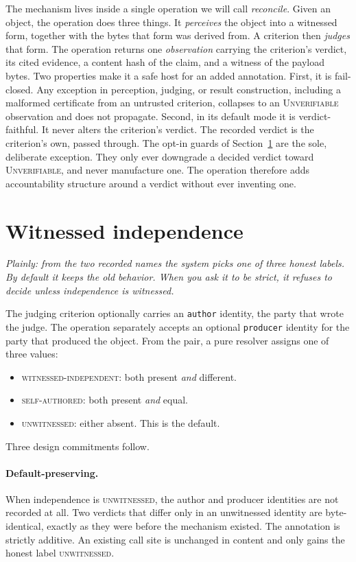 \documentclass[11pt]{article}
\begin{document}
The mechanism lives inside a single operation we will call \emph{reconcile}. Given an object, the operation does three things. It \emph{perceives} the object into a witnessed form, together with the bytes that form was derived from. A criterion then \emph{judges} that form. The operation returns one \emph{observation} carrying the criterion's verdict, its cited evidence, a content hash of the claim, and a witness of the payload bytes. Two properties make it a safe host for an added annotation. First, it is fail-closed. Any exception in perception, judging, or result construction, including a malformed certificate from an untrusted criterion, collapses to an \textsc{Unverifiable} observation and does not propagate. Second, in its default mode it is verdict-faithful. It never alters the criterion's verdict. The recorded verdict is the criterion's own, passed through. The opt-in guards of Section~\ref{sec:mech} are the sole, deliberate exception. They only ever downgrade a decided verdict toward \textsc{Unverifiable}, and never manufacture one. The operation therefore adds accountability structure around a verdict without ever inventing one.

\section{Witnessed independence}\label{sec:mech}
\emph{Plainly: from the two recorded names the system picks one of three honest labels. By default it keeps the old behavior. When you ask it to be strict, it refuses to decide unless independence is witnessed.}

The judging criterion optionally carries an \texttt{author} identity, the party that wrote the judge. The operation separately accepts an optional \texttt{producer} identity for the party that produced the object. From the pair, a pure resolver assigns one of three values:
\begin{itemize}[leftmargin=*,itemsep=1pt]
\item \textsc{witnessed-independent}: both present \emph{and} different.
\item \textsc{self-authored}: both present \emph{and} equal.
\item \textsc{unwitnessed}: either absent. This is the default.
\end{itemize}
Three design commitments follow.

\paragraph{Default-preserving.} When independence is \textsc{unwitnessed}, the author and producer identities are not recorded at all. Two verdicts that differ only in an unwitnessed identity are byte-identical, exactly as they were before the mechanism existed. The annotation is strictly additive. An existing call site is unchanged in content and only gains the honest label \textsc{unwitnessed}.
\end{document}
